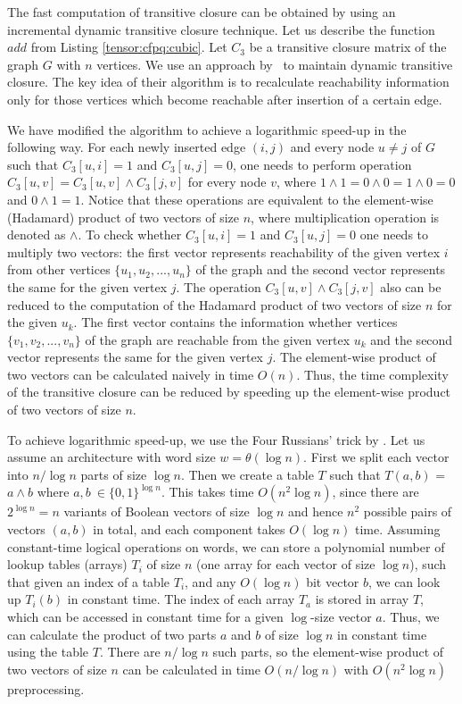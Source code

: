 The fast computation of transitive closure can be obtained by using an incremental dynamic transitive closure technique.
Let us describe the function $add$ from Listing \ref{tensor:cfpq:cubic}.
Let $C_3$ be a transitive closure matrix of the graph $G$ with $n$ vertices.
We use an approach by~\cite{IBARAKI198395} to maintain dynamic transitive closure.
The key idea of their algorithm is to recalculate reachability information only for those vertices which become reachable after insertion of a certain edge.

We have modified the algorithm to achieve a logarithmic speed-up in the following way.
For each newly inserted edge $(i, j)$ and every node $u \neq j$ of $G$ such that $C_3[u, i] = 1$ and $C_3[u, j]=0$, one needs to perform operation $C_3[u,v] = C_3[u, v] \wedge C_3[j, v]$ for every node $v$, where $1 \wedge 1 = 0 \wedge 0 = 1 \wedge 0 = 0$ and $0 \wedge 1 = 1$.
Notice that these operations are equivalent to the element-wise (Hadamard) product of two vectors of size $n$, where multiplication operation is denoted as $\wedge$. To check whether $C_3[u, i] = 1$ and $C_3[u, j]=0$ one needs to multiply two vectors: the first vector represents reachability of the given vertex $i$ from other vertices $\{u_1, u_2, ..., u_n\}$ of the graph and the second vector represents the same for the given vertex $j$. The operation $C_3[u, v] \wedge C_3[j, v]$ also can be reduced to the computation of the Hadamard product of two vectors of size $n$ for the given $u_k$. The first vector contains the information whether vertices  $\{v_1, v_2, ..., v_n\}$ of the graph are reachable from the given vertex $u_k$ and the second vector represents the same for the given vertex $j$. The element-wise product of two vectors can be calculated naively in time $O(n)$. Thus, the time complexity of the transitive closure can be reduced by speeding up the element-wise product of two vectors of size $n$.


To achieve logarithmic speed-up, we use the Four Russians' trick by \cite{arlazarov1970economical}.
Let us assume an architecture with word size $w= \theta(\log n)$.
First we split each vector into $n/\log n$ parts of size $\log n$.
Then we create a table $T$ such that $T(a, b)$ = $a \wedge b$ where $a, b \ \in {\{0,1\}}^{\log n}$.
This takes time $O(n^2 \log n)$, since there are $2^{\log n} = n$ variants of Boolean vectors of size $\log n$ and hence $n^2$ possible pairs of vectors $(a, b)$ in total, and each component takes $O(\log n)$ time.
Assuming constant-time logical operations on words, we can store a polynomial number of lookup tables (arrays) $T_i$ of size $n$ (one array for each vector of size $\log n$), such that given an index of a table $T_i$, and any $O(\log n)$ bit vector $b$, we can look up $T_i(b)$ in constant time. The index of each array $T_a$ is stored in array $T$, which can be accessed in constant time for a given $\log$-size vector $a$. Thus, we can calculate the product of two parts $a$ and $b$ of size $\log n$ in constant time using the table $T$.
There are $n/\log n$ such parts, so the element-wise product of two vectors of size $n$ can be calculated in time $O(n/\log n)$ with $O(n^2 \log n)$ preprocessing.

